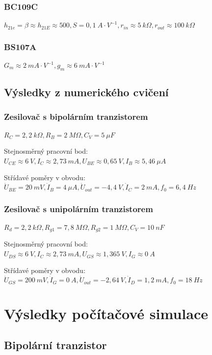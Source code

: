 \documentclass{protokol}
\begin{document}
	\subsubsection{BC109C}
	$ h_{21e}=\beta\approx h_{21E}\approx 500, S=0,1~A\cdot V^{-1}, r_{in}\approx 5~k\Omega, r_{out}\approx 100~k\Omega$
	
	\subsubsection{BS107A}
	$ G_{m}\approx 2~mA\cdot V^{-1}, g_{m}\approx6~mA\cdot V^{-1}$
	
	\subsection{Výsledky z numerického cvičení}
		\subsubsection{Zesilovač s bipolárním tranzistorem}
		$ R_{C}=2,2~k\Omega, R_{B}=2~M\Omega, C_V=5~\mu F $
		
		\noindent Stejnosměrný pracovní bod:\\
		$ U_{CE}\approx 6~V, I_{C}\approx2,73~mA, U_{BE}\approx0,65~V, I_{B}\approx5,46~\mu A$
		
		\noindent Střídavé poměry v obvodu:\\
		$ \dot{U}_{B E}=20~mV, \dot{I}_B=4~\mu A, \dot{U}_{out}=-4,4~V, \dot{I}_C=2~mA, f_{0}=6,4~Hz $
	
		\subsubsection{Zesilovač s unipolárním tranzistorem}
		$ R_{d}=2,2~k\Omega, R_{g1}=7,8~M\Omega, R_{g2}=1~M\Omega, C_V=10~nF $
		
		\noindent Stejnosměrný pracovní bod:\\
		$ U_{DS}\approx 6~V, I_{C}\approx2,73~mA, U_{GS}\approx1,365~V, I_{G}\approx0~A$
		
		\noindent Střídavé poměry v obvodu:\\
	$ \dot{U}_{GS}=200~mV, \dot{I}_G=0~A, \dot{U}_{out}=-2,64~V, \dot{I}_D=1,2~mA, f_{0}=18~Hz $
	
	\newpage
\section{Výsledky počítačové simulace}
\subsection{Bipolární tranzistor}
\end{document}
